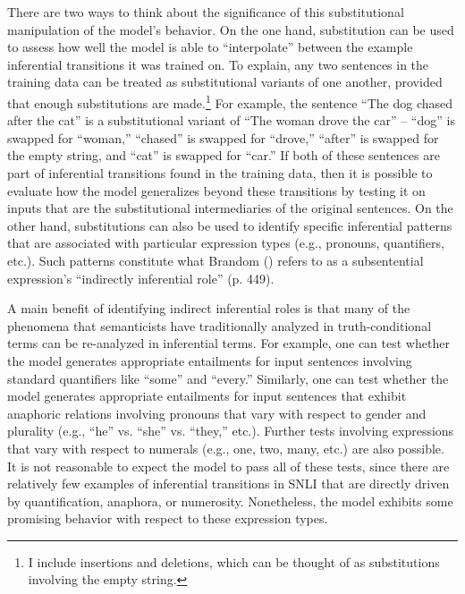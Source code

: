 There are two ways to think about the significance of this substitutional manipulation of the model's behavior. On the one hand, substitution can be used to assess how well the model is able to ``interpolate'' between the example inferential transitions it was trained on. To explain, any two sentences in the training data can be treated as substitutional variants of one another, provided that enough substitutions are made.\footnote{I include insertions and deletions, which can be thought of as substitutions involving the empty string.} For example, the sentence ``The dog chased after the cat'' is a substitutional variant of ``The woman drove the car'' -- ``dog'' is swapped for ``woman,'' ``chased'' is swapped for ``drove,'' ``after'' is swapped for the empty string, and ``cat'' is swapped for ``car.'' If both of these sentences are part of inferential transitions found in the training data, then it is possible to evaluate how the model generalizes beyond these transitions by testing it on inputs that are the substitutional intermediaries of the original sentences. On the other hand, substitutions can also be used to identify specific inferential patterns that are associated with particular expression types (e.g., pronouns, quantifiers, etc.). Such patterns constitute what Brandom (\citeyear{Brandom:1994}) refers to as a subsentential expression's ``indirectly inferential role'' (p. 449). 

A main benefit of identifying indirect inferential roles is that many of the phenomena that semanticists have traditionally analyzed in truth-conditional terms can be re-analyzed in inferential terms. For example, one can test whether the model generates appropriate entailments for input sentences involving standard quantifiers like ``some'' and ``every.'' Similarly, one can test whether the model generates appropriate entailments for input sentences that exhibit anaphoric relations involving pronouns that vary with respect to gender and plurality (e.g., ``he'' vs. ``she'' vs. ``they,'' etc.). Further tests involving expressions that vary with respect to numerals (e.g., one, two, many, etc.) are also possible. It is not reasonable to expect the model to pass all of these tests, since there are relatively few examples of inferential transitions in SNLI that are directly driven by quantification, anaphora, or numerosity. Nonetheless, the model exhibits some promising behavior with respect to these expression types.

